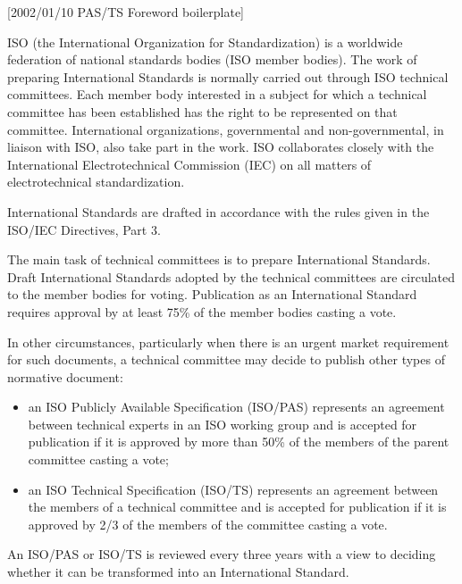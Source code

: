 [2002/01/10 PAS/TS Foreword boilerplate]

    ISO (the International Organization for Standardization) is a worldwide
federation of national standards bodies (ISO member bodies). The work
of preparing International Standards is normally carried out through
ISO technical committees. Each member body interested in a subject for
which a technical committee has been established has the right to be
represented on that committee. International organizations,
governmental and non-governmental, in liaison with ISO, also take part
in the work. ISO collaborates closely with the International
Electrotechnical Commission (IEC) on all matters of electrotechnical
standardization.

    International Standards are drafted in accordance with the rules
given in the ISO/IEC Directives, Part 3.

    The main task of technical committees is to prepare International
Standards. Draft International Standards adopted by the technical
committees are circulated to the member bodies for voting. Publication
as an International Standard requires approval by at least 75\% of the
member bodies casting a vote.

    In other circumstances, particularly when there is an urgent market
requirement for such documents, a technical committee may decide to
publish other types of normative document:
\begin{itemize}
\item an ISO Publicly Available Specification (ISO/PAS) represents an
agreement between technical experts in an ISO working group and is
accepted for publication if it is approved by more than 50\% of the
members of the parent committee casting a vote;

\item an ISO Technical Specification (ISO/TS) represents an agreement
between the members of a technical committee and is accepted for
publication if it is approved by 2/3 of the members of the committee
casting a vote.
\end{itemize}

    An ISO/PAS or ISO/TS is reviewed every three years with a view to
deciding whether it can be transformed into an International Standard.
\par

\endinput

